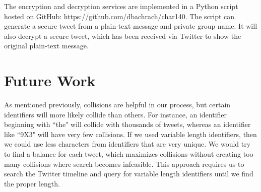 \documentclass{article}
\begin{document}
The encryption and decryption services are implemented in a Python script hosted on GitHub: https://github.com/dbachrach/char140. The script can generate a secure tweet from a plain-text message and private group name. It will also decrypt a secure tweet, which has been received via Twitter to show the original plain-text message.

\section*{Future Work}

As mentioned previously, collisions are helpful in our process, but certain identifiers will more likely collide than others. For instance, an identifier beginning with ``the" will collide with thousands of tweets, whereas an identifier like ``9X3" will have very few collisions. If we used variable length identifiers, then we could use less characters from identifiers that are very unique. We would try to find a balance for each tweet, which maximizes collisions without creating too many collisions where search becomes infeasible. This approach requires us to search the Twitter timeline and query for variable length identifiers until we find the proper length.
\end{document}
